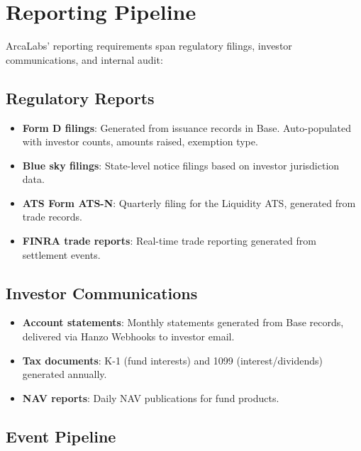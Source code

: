 \documentclass[11pt]{article}
\begin{document}
\section{Reporting Pipeline}
\label{sec:reporting}

ArcaLabs' reporting requirements span regulatory filings, investor
communications, and internal audit:

\subsection{Regulatory Reports}

\begin{itemize}[leftmargin=1.4em]
    \item \textbf{Form D filings}: Generated from issuance records in
    Base. Auto-populated with investor counts, amounts raised,
    exemption type.
    \item \textbf{Blue sky filings}: State-level notice filings based
    on investor jurisdiction data.
    \item \textbf{ATS Form ATS-N}: Quarterly filing for the Liquidity
    ATS, generated from trade records.
    \item \textbf{FINRA trade reports}: Real-time trade reporting
    generated from settlement events.
\end{itemize}

\subsection{Investor Communications}

\begin{itemize}[leftmargin=1.4em]
    \item \textbf{Account statements}: Monthly statements generated from
    Base records, delivered via Hanzo Webhooks to investor email.
    \item \textbf{Tax documents}: K-1 (fund interests) and 1099
    (interest/dividends) generated annually.
    \item \textbf{NAV reports}: Daily NAV publications for fund products.
\end{itemize}

\subsection{Event Pipeline}
\end{document}
